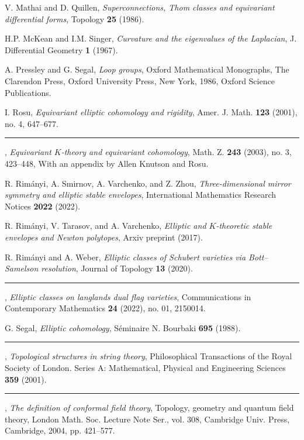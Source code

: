\begin{description}[leftmargin=5.6em,labelwidth=5.2em,labelsep=0.4em,itemsep=0.5ex,parsep=0pt,topsep=0.8ex]
\item[\textbf{[MQ86]}] V. Mathai and D. Quillen, \textit{Superconnections, Thom classes and equivariant differential forms}, Topology \textbf{25} (1986).
\item[\textbf{[MS67]}] H.P. McKean and I.M. Singer, \textit{Curvature and the eigenvalues of the Laplacian}, J. Differential Geometry \textbf{1} (1967).
\item[\textbf{[PS86]}] A. Pressley and G. Segal, \textit{Loop groups}, Oxford Mathematical Monographs, The Clarendon Press, Oxford University Press, New York, 1986, Oxford Science Publications.
\item[\textbf{[Ros01]}] I. Rosu, \textit{Equivariant elliptic cohomology and rigidity}, Amer. J. Math. \textbf{123} (2001), no. 4, 647--677.
\item[\textbf{[Ros03]}] \rule[0.45ex]{2.6em}{0.45pt}, \textit{Equivariant $K$-theory and equivariant cohomology}, Math. Z. \textbf{243} (2003), no. 3, 423--448, With an appendix by Allen Knutson and Rosu.
\item[\textbf{[RSVZ22]}] R. Rim\'anyi, A. Smirnov, A. Varchenko, and Z. Zhou, \textit{Three-dimensional mirror symmetry and elliptic stable envelopes}, International Mathematics Research Notices \textbf{2022} (2022).
\item[\textbf{[RTV17]}] R. Rim\'anyi, V. Tarasov, and A. Varchenko, \textit{Elliptic and $K$-theoretic stable envelopes and Newton polytopes}, Arxiv preprint (2017).
\item[\textbf{[RW20]}] R. Rim\'anyi and A. Weber, \textit{Elliptic classes of Schubert varieties via Bott--Samelson resolution}, Journal of Topology \textbf{13} (2020).
\item[\textbf{[RW22]}] \rule[0.45ex]{2.6em}{0.45pt}, \textit{Elliptic classes on langlands dual flag varieties}, Communications in Contemporary Mathematics \textbf{24} (2022), no. 01, 2150014.
\item[\textbf{[Seg88]}] G. Segal, \textit{Elliptic cohomology}, S\'eminaire N. Bourbaki \textbf{695} (1988).
\item[\textbf{[Seg01]}] \rule[0.45ex]{2.6em}{0.45pt}, \textit{Topological structures in string theory}, Philosophical Transactions of the Royal Society of London. Series A: Mathematical, Physical and Engineering Sciences \textbf{359} (2001).
\item[\textbf{[Seg04]}] \rule[0.45ex]{2.6em}{0.45pt}, \textit{The definition of conformal field theory}, Topology, geometry and quantum field theory, London Math. Soc. Lecture Note Ser., vol. 308, Cambridge Univ. Press, Cambridge, 2004, pp. 421--577.

\end{description}
